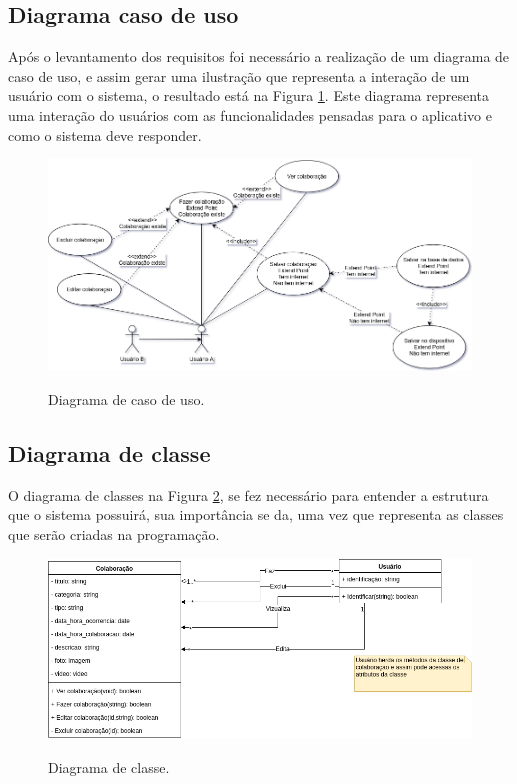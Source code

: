     
    \subsection{Diagrama caso de uso}
   Após o levantamento dos requisitos foi necessário a realização de um diagrama de caso de uso, e assim gerar uma ilustração que representa a interação de um usuário com o sistema, o resultado está na Figura \ref{fig:userCase}. Este diagrama representa uma interação do usuários com as funcionalidades pensadas para o aplicativo e como o sistema deve responder.
    
    \begin{figure}[H]
    	\centering
    	\caption{Diagrama de caso de uso.}	
    	\includegraphics[width=\linewidth]{Imagens/userCase}
    	\label{fig:userCase}
    \end{figure}
    
        
    \subsection{Diagrama de classe}
O diagrama de classes na Figura \ref{fig:diagClass}, se fez necessário para entender a estrutura que o sistema possuirá, sua importância se da, uma vez que representa as classes que serão criadas na programação.
    \begin{figure}[H]
    	\centering
    	\caption{Diagrama de classe.}	
    	\includegraphics[width=\linewidth,]{Imagens/diagClass.png}
    	\label{fig:diagClass}
    \end{figure}
    
